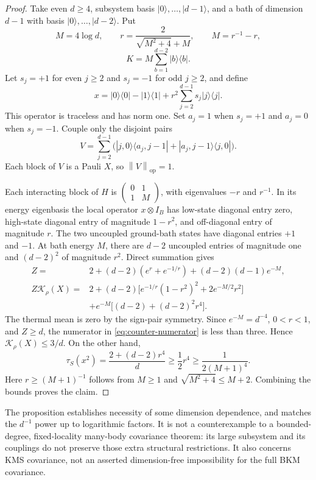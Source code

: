 \documentclass[11pt]{article}
\theoremstyle{remark}\newtheorem{remark}[theorem]{Remark}
\newcommand{\op}{\mathrm{op}}
\newcommand{\norm}[1]{\left\lVert #1\right\rVert}
\newcommand{\tauS}{\tau_S}
\begin{document}
\begin{proof}
Take even $d\geq4$, subsystem basis $|0\rangle,\ldots,|d-1\rangle$, and a bath of dimension $d-1$ with basis $|0\rangle,\ldots,|d-2\rangle$. Put
\[
 M=4\log d,\qquad
 r=\frac{2}{\sqrt{M^2+4}+M},\qquad M=r^{-1}-r,
\]
\[
 K=M\sum_{b=1}^{d-2}|b\rangle\langle b|.
\]
Let $s_j=+1$ for even $j\geq2$ and $s_j=-1$ for odd $j\geq2$, and define
\[
 x=|0\rangle\langle0|-|1\rangle\langle1|
   +r^2\sum_{j=2}^{d-1}s_j|j\rangle\langle j|.
\]
This operator is traceless and has norm one. Set $a_j=1$ when $s_j=+1$ and $a_j=0$ when $s_j=-1$. Couple only the disjoint pairs
\[
 V=\sum_{j=2}^{d-1}\bigl(|j,0\rangle\langle a_j,j-1|
             +|a_j,j-1\rangle\langle j,0|\bigr).
\]
Each block of $V$ is a Pauli $X$, so $\norm V_\op=1$.

Each interacting block of $H$ is $\left(\begin{smallmatrix}0&1\\1&M\end{smallmatrix}\right)$, with eigenvalues $-r$ and $r^{-1}$. In its energy eigenbasis the local operator $x\otimes I_B$ has low-state diagonal entry zero, high-state diagonal entry of magnitude $1-r^2$, and off-diagonal entry of magnitude $r$. The two uncoupled ground-bath states have diagonal entries $+1$ and $-1$. At bath energy $M$, there are $d-2$ uncoupled entries of magnitude one and $(d-2)^2$ of magnitude $r^2$. Direct summation gives
\begin{align}
 Z={}&2+(d-2)(e^r+e^{-1/r})+(d-2)(d-1)e^{-M},\\
 Z\mathcal K_\rho(X)={}&2+(d-2)\bigl[e^{-1/r}(1-r^2)^2+2e^{-M/2}r^2\bigr]\nonumber\\
 &+e^{-M}\bigl[(d-2)+(d-2)^2r^4\bigr].\label{eq:counter-numerator}
\end{align}
The thermal mean is zero by the sign-pair symmetry. Since $e^{-M}=d^{-4}$, $0<r<1$, and $Z\geq d$, the numerator in \eqref{eq:counter-numerator} is less than three. Hence $\mathcal K_\rho(X)\leq3/d$. On the other hand,
\[
 \tauS(x^2)=\frac{2+(d-2)r^4}{d}\geq\frac12r^4
 \geq\frac{1}{2(M+1)^4}.
\]
Here $r\geq(M+1)^{-1}$ follows from $M\geq1$ and $\sqrt{M^2+4}\leq M+2$. Combining the bounds proves the claim.
\end{proof}

The proposition establishes necessity of some dimension dependence, and matches the $d^{-1}$ power up to logarithmic factors. It is not a counterexample to a bounded-degree, fixed-locality many-body covariance theorem: its large subsystem and its couplings do not preserve those extra structural restrictions. It also concerns KMS covariance, not an asserted dimension-free impossibility for the full BKM covariance.
\end{document}
